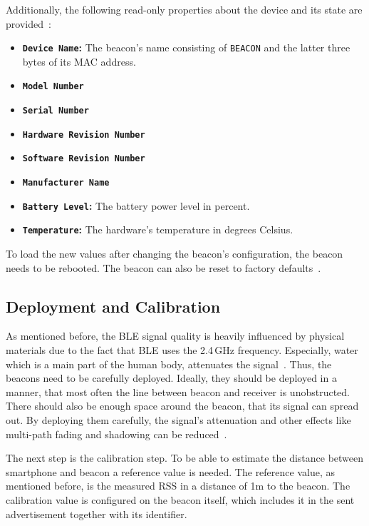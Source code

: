 \noindent Additionally, the following read-only properties about the device and its state are provided~\citep{binside:ds}:
\begin{itemize}
  \item \textbf{\texttt{Device Name}:} The beacon's name consisting of \texttt{BEACON} and the latter three bytes of its \acs{MAC} address.
  \item \textbf{\texttt{Model Number}}
  \item \textbf{\texttt{Serial Number}}
  \item \textbf{\texttt{Hardware Revision Number}}
  \item \textbf{\texttt{Software Revision Number}}
  \item \textbf{\texttt{Manufacturer Name}}
  \item \textbf{\texttt{Battery Level}:} The battery power level in percent.
  \item \textbf{\texttt{Temperature}:} The hardware's temperature in degrees Celsius.
\end{itemize}

\noindent To load the new values after changing the beacon's configuration, the beacon needs to be rebooted. The beacon can also be reset to factory defaults~\citep{binside:ds}.

\subsection{Deployment and Calibration}
As mentioned before, the \ac{BLE} signal quality is heavily influenced by physical materials due to the fact that \ac{BLE} uses the 2.4\,GHz frequency. Especially, water which is a main part of the human body, attenuates the signal~\citep{apple:getting_started}. Thus, the beacons need to be carefully deployed. Ideally, they should be deployed in a manner, that most often the line between beacon and receiver is unobstructed. There should also be enough space around the beacon, that its signal can spread out. By deploying them carefully, the signal's attenuation and other effects like multi-path fading and shadowing can be reduced~\citep{apple:getting_started,IEEE:survey_wireless_indoor_pos}.

The next step is the calibration step. To be able to estimate the distance between smartphone and beacon a reference value is needed. The reference value, as mentioned before, is the measured \ac{RSS} in a distance of 1m to the beacon. The calibration value is configured on the beacon itself, which includes it in the sent advertisement together with its identifier.

